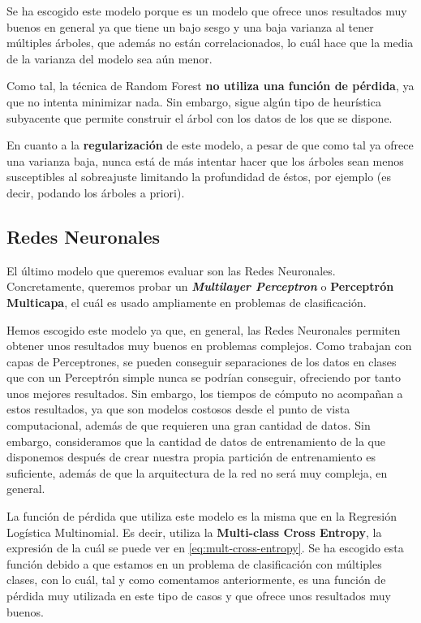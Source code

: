 \documentclass[11pt,a4paper]{article}
\begin{document}
Se ha escogido este modelo porque es un modelo que ofrece unos resultados muy buenos en general ya que tiene un bajo sesgo y una baja varianza
al tener múltiples árboles, que además no están correlacionados, lo cuál hace que la media de la varianza del modelo sea aún menor.

Como tal, la técnica de Random Forest \textbf{no utiliza una función de pérdida}, ya que no intenta minimizar nada. Sin embargo, sigue algún tipo de
heurística subyacente que permite construir el árbol con los datos de los que se dispone.

En cuanto a la \textbf{regularización} de este modelo, a pesar de que como tal ya ofrece una varianza baja, nunca está de más intentar hacer que
los árboles sean menos susceptibles al sobreajuste limitando la profundidad de éstos, por ejemplo (es decir, podando los árboles a priori).

\subsection{Redes Neuronales}

El último modelo que queremos evaluar son las Redes Neuronales. Concretamente, queremos probar un \textbf{\textit{Multilayer Perceptron}} o
\textbf{Perceptrón Multicapa}, el cuál es usado ampliamente en problemas de clasificación.

Hemos escogido este modelo ya que, en general, las Redes Neuronales permiten obtener unos resultados muy buenos en problemas complejos.
Como trabajan con capas de Perceptrones, se pueden conseguir separaciones de los datos en clases que con un Perceptrón simple nunca se
podrían conseguir, ofreciendo por tanto unos mejores resultados. Sin embargo, los tiempos de cómputo no acompañan a estos resultados, ya que
son modelos costosos desde el punto de vista computacional, además de que requieren una gran cantidad de datos. Sin embargo, consideramos que
la cantidad de datos de entrenamiento de la que disponemos después de crear nuestra propia partición de entrenamiento es suficiente, además
de que la arquitectura de la red no será muy compleja, en general.

La función de pérdida que utiliza este modelo es la misma que en la Regresión Logística Multinomial. Es decir, utiliza la \textbf{Multi-class
Cross Entropy}, la expresión de la cuál se puede ver en \eqref{eq:mult-cross-entropy}. Se ha escogido esta función debido a que estamos
en un problema de clasificación con múltiples clases, con lo cuál, tal y como comentamos anteriormente, es una función de pérdida muy utilizada
en este tipo de casos y que ofrece unos resultados muy buenos.
\end{document}
